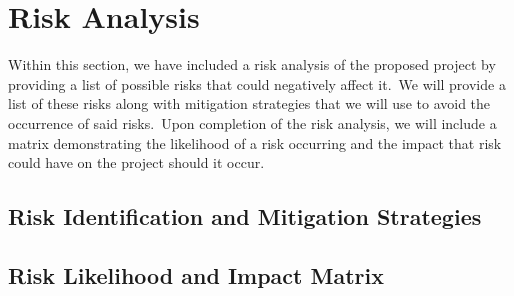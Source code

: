 \chapter{Risk Analysis} \label{ch:risk}

    Within this section, we have included a risk analysis of the proposed project by providing a list of possible risks
    that could negatively affect it.\ We will provide a list of these risks along with mitigation strategies that we will
    use to avoid the occurrence of said risks.\ Upon completion of the risk analysis, we will include a matrix
    demonstrating the likelihood of a risk occurring and the impact that risk could have on the project should it occur.

	\section{Risk Identification and Mitigation Strategies}

    	\vspace{3em}  \vspace{6em}

	\section{Risk Likelihood and Impact Matrix}

		\vspace{3em} 
